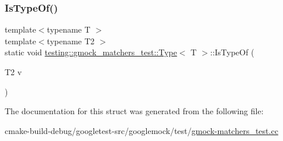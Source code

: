 \mbox{\label{structtesting_1_1gmock__matchers__test_1_1Type_a5451b10be4ff47bd2dc3741eb70dde59}} 
\subsubsection{\texorpdfstring{IsTypeOf()}{IsTypeOf()}\hspace{0.1cm}{\footnotesize\ttfamily [2/2]}}
{\footnotesize\ttfamily template$<$typename T $>$ \\
template$<$typename T2 $>$ \\
static void \mbox{\hyperlink{structtesting_1_1gmock__matchers__test_1_1Type}{testing\+::gmock\+\_\+matchers\+\_\+test\+::\+Type}}$<$ T $>$\+::Is\+Type\+Of (\begin{DoxyParamCaption}\item[{T2}]{v }\end{DoxyParamCaption})\hspace{0.3cm}{\ttfamily [static]}}



The documentation for this struct was generated from the following file\+:\begin{DoxyCompactItemize}
\item 
cmake-\/build-\/debug/googletest-\/src/googlemock/test/\mbox{\hyperlink{gmock-matchers__test_8cc}{gmock-\/matchers\+\_\+test.\+cc}}\end{DoxyCompactItemize}
